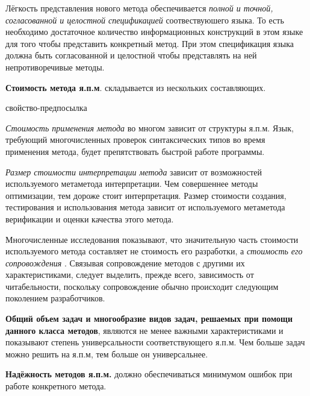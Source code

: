 Лёгкость представления нового метода обеспечивается\textit{ полной и точной, согласованной и целостной спецификацией} соотвествуюшего языка. То есть необходимо достаточное количество информационных конструкций в этом языке для того чтобы представить конкретный метод. При этом спецификация языка должна быть согласованной и целостной чтобы представлять на ней непротиворечивые методы.

\textbf{Стоимость метода я.п.м}. складывается из нескольких составляющих.

\begin{SCn}
\begin{scnrelfromlist}{свойство-предпосылка}
\end{scnrelfromlist}
\end{SCn}

\textit{Стоимость применения метода} во многом зависит от структуры я.п.м. Язык, требующий многочисленных проверок синтаксических типов во время применения метода, будет препятствовать быстрой работе программы.

\textit{Размер стоимости интерпретации метода} зависит от возможностей используемого метаметода интерпретации. Чем совершеннее методы оптимизации, тем дороже стоит интерпретация.
Размер стоимости создания, тестирования и использования метода зависит от используемого метаметода верификации и оценки качества этого метода.

Многочисленные исследования показывают, что значительную часть стоимости используемого метода составляет не стоимость его разработки, а \textit{стоимость его сопровождения} \cite{Brooks2021}. Связывая сопровождение методов с другими их характеристиками, следует выделить, прежде всего, зависимость от читабельности, поскольку сопровождение обычно происходит следующим поколением разработчиков.

\textbf{Общий объем задач и многообразие видов задач, решаемых при помощи данного класса методов}, являются не менее важными характеристиками и показывают степень универсальности соответствующего я.п.м. Чем больше задач можно решить на я.п.м, тем больше он универсальнее.

\textbf{Надёжность методов я.п.м.} должно обеспечиваться минимумом ошибок при работе конкретного метода.

